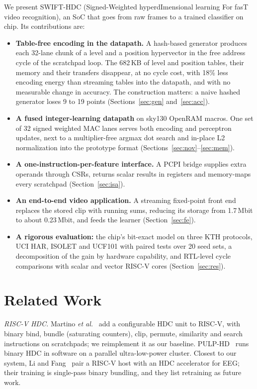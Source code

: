 \documentclass[conference]{IEEEtran}
\begin{document}
We present SWIFT-HDC (Signed-Weighted hyperdImensional learning For fasT video recognition), an SoC that goes from raw frames to a trained classifier on chip. Its contributions are:
\begin{itemize}
\item \textbf{Table-free encoding in the datapath.} A hash-based generator produces each 32-lane chunk of a level and a position hypervector in the free address cycle of the scratchpad loop. The 682\,KB of level and position tables, their memory and their transfers disappear, at no cycle cost, with 18\% less encoding energy than streaming tables into the datapath, and with no measurable change in accuracy. The construction matters: a naive hashed generator loses 9 to 19 points (Sections~\ref{sec:gen} and~\ref{sec:acc}).
\item \textbf{A fused integer-learning datapath} on sky130 OpenRAM macros. One set of 32 signed weighted MAC lanes serves both encoding and perceptron updates, next to a multiplier-free argmax dot search and in-place L2 normalization into the prototype format (Sections~\ref{sec:nov}--\ref{sec:mem}).
\item \textbf{A one-instruction-per-feature interface.} A PCPI bridge supplies extra operands through CSRs, returns scalar results in registers and memory-maps every scratchpad (Section~\ref{sec:isa}).
\item \textbf{An end-to-end video application.} A streaming fixed-point front end replaces the stored clip with running sums, reducing its storage from 1.7\,Mbit to about 0.23\,Mbit, and feeds the learner (Section~\ref{sec:fe}).
\item \textbf{A rigorous evaluation:} the chip's bit-exact model on three KTH protocols, UCI HAR, ISOLET and UCF101 with paired tests over 20 seed sets, a decomposition of the gain by hardware capability, and RTL-level cycle comparisons with scalar and vector RISC-V cores (Section~\ref{sec:res}).
\end{itemize}

\section{Related Work}
\label{sec:rel}
\emph{RISC-V HDC.} Martino \emph{et al.}~\cite{martino2026} add a configurable HDC unit to RISC-V, with binary bind, bundle (saturating counters), clip, permute, similarity and search instructions on scratchpads; we reimplement it as our baseline. PULP-HD~\cite{montagna2018} runs binary HDC in software on a parallel ultra-low-power cluster. Closest to our system, Li and Fang~\cite{li2024eeg} pair a RISC-V host with an HDC accelerator for EEG; their training is single-pass binary bundling, and they list retraining as future work.
\end{document}
